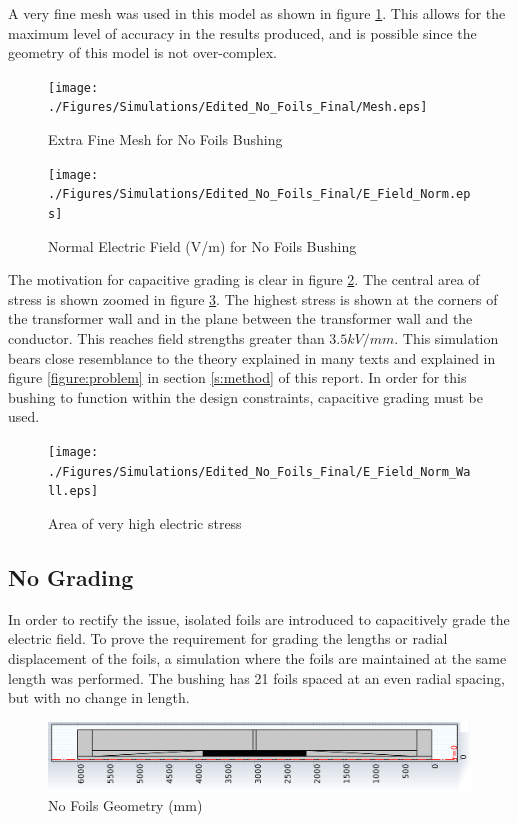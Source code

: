 A very fine mesh was used in this model as shown in figure \ref{Figure:No_Foil_Mesh}. This allows for the maximum level of accuracy in the results produced, and is possible since the geometry of this model is not over-complex.
\begin{figure}[!h]
  \centering
    \texttt{[image: ./Figures/Simulations/Edited\_No\_Foils\_Final/Mesh.eps]} 
	\caption{Extra Fine Mesh for No Foils Bushing}
\label{Figure:No_Foil_Mesh}
\end{figure}


\begin{figure}[!h]
  \centering
    \texttt{[image: ./Figures/Simulations/Edited\_No\_Foils\_Final/E\_Field\_Norm.eps]} 
	\caption{Normal Electric Field (V/m) for No Foils Bushing}
\label{Figure:No_Foil_Field}
\end{figure}


The motivation for capacitive grading is clear in figure \ref{Figure:No_Foil_Field}. 
The central area of stress is shown zoomed in figure \ref{figure:problemfield}.
The highest stress is shown at the corners of the transformer wall and in the plane between the transformer wall and the conductor.
This reaches field strengths greater than $3.5kV/mm$.
This simulation bears close resemblance to the theory explained in many texts and explained in figure \ref{figure:problem} in section \ref{s:method} of this report.
In order for this bushing to function within the design constraints, capacitive grading must be used.

\begin{figure}[!h]
   \centering
   \texttt{[image: ./Figures/Simulations/Edited\_No\_Foils\_Final/E\_Field\_Norm\_Wall.eps]}
   \caption{Area of very high electric stress}
   \label{figure:problemfield}
\end{figure}

\subsection{No Grading}
In order to rectify the issue, isolated foils are introduced to capacitively grade the electric field.
To prove the requirement for grading the lengths or radial displacement of the foils, a simulation where the foils are maintained at the same length was performed.
The bushing has 21 foils spaced at an even radial spacing, but with no change in length.

\begin{figure}[!h]
  \centering
    \includegraphics[width = \textwidth]{./Figures/Simulations/Edited_No_Grading_Final/Geometry.png} 
	\caption{No Foils Geometry (mm)}
	\label{Figure:No_Grading_Geom}
\end{figure}

